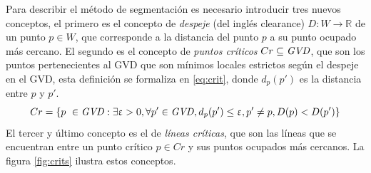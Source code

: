 Para describir el método de segmentación es necesario introducir tres nuevos conceptos, el primero es el concepto de \emph{despeje} (del inglés clearance) $D : W \rightarrow \mathds{R}$ de un punto $p \in W$, que corresponde a la distancia del punto $p$ a su punto ocupado más cercano. El segundo es el concepto de \emph{puntos críticos} $Cr \subseteq \mathit{GVD}$, que son los puntos pertenecientes al GVD que son mínimos locales estrictos según el despeje en el GVD, esta definición se formaliza en \eqref{eq:crit}, donde $d_p(p')$ es la distancia entre $p$ y $p'$. 
\begin{equation}
  Cr = \{p\ \in \mathit{GVD} : \exists \upvarepsilon > 0, \forall p' \in \mathit{GVD}, d_p(p') \leq \upvarepsilon, p' \neq p ,  D(p) < D(p') \} \label{eq:crit}
\end{equation}
El tercer y último concepto es el de \emph{líneas críticas}, que son las líneas
que se encuentran entre un punto crítico $p \in Cr$ y sus puntos ocupados más
cercanos. La figura \ref{fig:crits} ilustra
estos conceptos.

